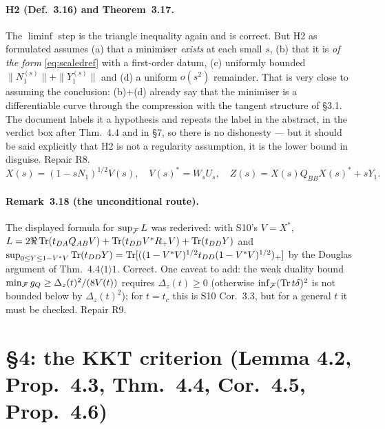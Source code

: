 \documentclass[11pt]{article}
\begin{document}
\paragraph{H2 (Def.~3.16) and Theorem~3.17.}  The $\liminf$ step is the triangle
inequality again and is correct.  But H2 as formulated assumes (a) that a minimiser
\emph{exists} at each small $s$, (b) that it is \emph{of the form} \eqref{eq:scaledref}
with a first-order datum, (c) uniformly bounded $\|N_1^{(s)}\|+\|Y_1^{(s)}\|$ and
(d) a uniform $o(s^2)$ remainder.  That is very close to assuming the conclusion: (b)+(d)
already say that the minimiser is a differentiable curve through the compression with the
tangent structure of \S3.1.  The document labels it a hypothesis and repeats the label in
the abstract, in the verdict box after Thm.~4.4 and in \S7, so there is no dishonesty ---
but it should be said explicitly that H2 is not a regularity assumption, it is the lower
bound in disguise.  Repair R8.
\begin{equation}\label{eq:scaledref}
 X(s)=(1-sN_1)^{1/2}V(s),\quad V(s)^*=W_sU_s,\quad Z(s)=X(s)Q_{BB}X(s)^*+sY_1 .
\end{equation}

\paragraph{Remark~3.18 (the unconditional route).}  The displayed formula for $\sup_\mathcal F L$
was rederived: with S10's $V=X^*$, $L=2\Re\operatorname{Tr}(t_{DA}Q_{AB}V)+\operatorname{Tr}(t_{DD}V^*R_+V)+\operatorname{Tr}(t_{DD}Y)$
and $\sup_{0\le Y\le1-V^*V}\operatorname{Tr}(t_{DD}Y)=\operatorname{Tr}[((1-V^*V)^{1/2}t_{DD}(1-V^*V)^{1/2})_+]$ by the
Douglas argument of Thm.~4.4$\langle1\rangle1$.  Correct.  One caveat to add: the weak
duality bound $\min_\mathcal F g_Q\ge\Delta_z(t)^2/(8V(t))$ requires $\Delta_z(t)\ge0$ (otherwise
$\inf_\mathcal F(\operatorname{Tr} t\delta)^2$ is not bounded below by $\Delta_z(t)^2$); for $t=t_c$ this is
S10 Cor.~3.3, but for a general $t$ it must be checked.  Repair R9.

\section{\S4: the KKT criterion (Lemma 4.2, Prop.~4.3, Thm.~4.4, Cor.~4.5, Prop.~4.6)}\label{sec:kkt}
\end{document}
